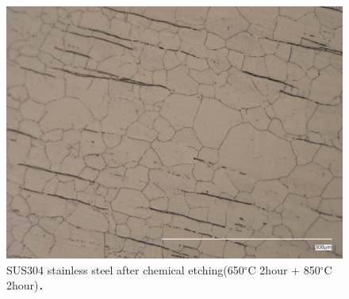 \begin{figure}[htbp]
    \centering %
    \includegraphics[width=100truemm,clip]{fig/241218_304650C2h850C2h_ethcing.jpg}
    \caption{SUS304 stainless steel after chemical etching(650$^\circ$C 2hour + 850$^\circ$C 2hour)．}
    \label{fig:304850Etching}
\end{figure}

